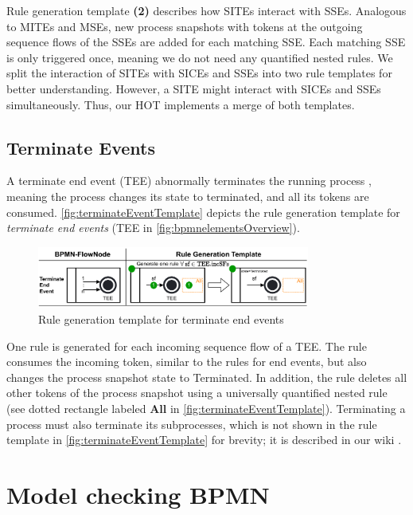 \documentclass{lmcs} %
\begin{document}
Rule generation template \textbf{(2)} describes how SITEs interact with SSEs.
Analogous to MITEs and MSEs, new process snapshots with tokens at the outgoing sequence flows of the SSEs are added for each matching SSE.
Each matching SSE is only triggered once, meaning we do not need any quantified nested rules.
We split the interaction of SITEs with SICEs and SSEs into two rule templates for better understanding.
However, a SITE might interact with SICEs and SSEs simultaneously.
Thus, our HOT implements a merge of both templates.

\subsection{Terminate Events}
A terminate end event (TEE) abnormally terminates the running process \cite{objectmanagementgroupBusinessProcessModel2013}, meaning the process changes its state to terminated, and all its tokens are consumed.
\autoref{fig:terminateEventTemplate} depicts the rule generation template for \textit{terminate end events} (\textsf{TEE} in \autoref{fig:bpmnelementsOverview}).

\begin{figure}[ht]
    \centering
    \includegraphics[width=0.8\textwidth]{images/terminate_end_event_template.pdf}
    \caption{Rule generation template for terminate end events}
    \label{fig:terminateEventTemplate}
\end{figure}

One rule is generated for each incoming sequence flow of a TEE.
The rule consumes the incoming token, similar to the rules for end events, but also changes the process snapshot state to \textsf{Terminated}.
In addition, the rule deletes all other tokens of the process snapshot using a universally quantified nested rule (see dotted rectangle labeled \textbf{All} in \autoref{fig:terminateEventTemplate}).
Terminating a process must also terminate its subprocesses, which is not shown in the rule template in \autoref{fig:terminateEventTemplate} for brevity; it is described in our wiki \cite{timkrauterLMCS2024Artifacts2023}.

\section{Model checking BPMN} \label{sec:modelChecking}
\end{document}
